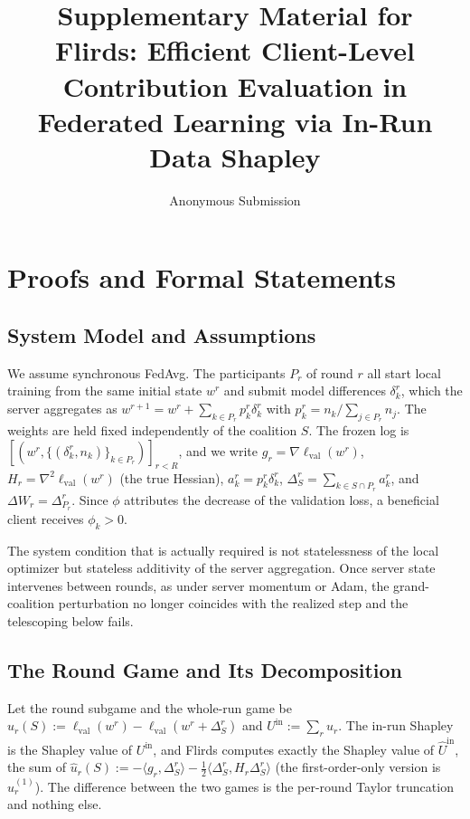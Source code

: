 \documentclass[letterpaper]{article} %
\title{Supplementary Material for\\Flirds: Efficient Client-Level Contribution Evaluation in Federated Learning via In-Run Data Shapley}
\author{
    Anonymous Submission
}
\theoremstyle{plain}
\newcommand{\lval}{\ell_{\mathrm{val}}}
\begin{document}
\maketitle
\appendix

\section{Proofs and Formal Statements}
\label{app:proofs}

\subsection{System Model and Assumptions}
\label{app:model}

We assume synchronous FedAvg. The participants $P_r$ of round $r$ all start
local training from the same initial state $w^r$ and submit model differences
$\delta_k^r$, which the server aggregates as
$w^{r+1} = w^r + \sum_{k \in P_r} p_k^r \delta_k^r$ with
$p_k^r = n_k / \sum_{j \in P_r} n_j$. The weights are held fixed
independently of the coalition $S$. The frozen log is
$[(w^r, \{(\delta_k^r, n_k)\}_{k \in P_r})]_{r<R}$, and we write
$g_r = \nabla\lval(w^r)$, $H_r = \nabla^2\lval(w^r)$ (the true Hessian),
$a_k^r = p_k^r \delta_k^r$, $\Delta_S^r = \sum_{k \in S \cap P_r} a_k^r$, and
$\Delta W_r = \Delta_{P_r}^r$. Since $\phi$ attributes the decrease of the
validation loss, a beneficial client receives $\phi_k > 0$.

The system condition that is actually required is not statelessness of the
local optimizer but stateless additivity of the server aggregation. Once
server state intervenes between rounds, as under server momentum or Adam, the
grand-coalition perturbation no longer coincides with the realized step and
the telescoping below fails.

\subsection{The Round Game and Its Decomposition}
\label{app:game}

Let the round subgame and the whole-run game be
$u_r(S) := \lval(w^r) - \lval(w^r + \Delta_S^r)$ and
$U^{\mathrm{in}} := \sum_r u_r$. The in-run Shapley is the Shapley value of
$U^{\mathrm{in}}$, and Flirds computes exactly the Shapley value of
$\hat U^{\mathrm{in}}$, the sum of
$\hat u_r(S) := -\langle g_r, \Delta_S^r\rangle
- \tfrac12\langle \Delta_S^r, H_r \Delta_S^r\rangle$
(the first-order-only version is $\hat u_r^{(1)}$). The difference between
the two games is the per-round Taylor truncation and nothing else.
\end{document}
